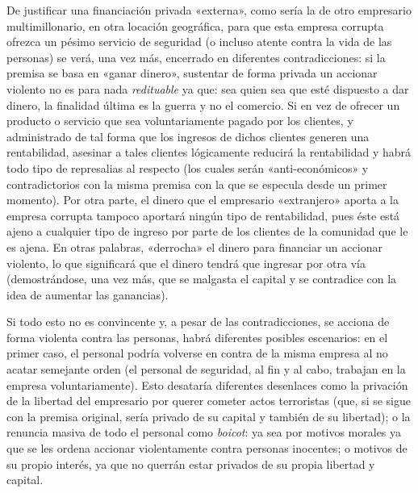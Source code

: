 \documentclass[12pt,a4paper,twoside]{book}
\begin{document}
De justificar una financiación privada «externa», como sería la de otro empresario multimillonario, en otra locación geográfica, para que esta empresa corrupta ofrezca un pésimo servicio de seguridad (o incluso atente contra la vida de las personas) se verá, una vez más, encerrado en diferentes contradicciones: si la premisa se basa en «ganar dinero», sustentar de forma privada un accionar violento no es para nada \textit{redituable} ya que: sea quien sea que esté dispuesto a dar dinero, la finalidad última es la guerra y no el comercio. Si en vez de ofrecer un producto o servicio que sea voluntariamente pagado por los clientes, y administrado de tal forma que los ingresos de dichos clientes generen una rentabilidad, asesinar a tales clientes lógicamente reducirá la rentabilidad y habrá todo tipo de represalias al respecto (los cuales serán «anti-económicos» y contradictorios con la misma premisa con la que se especula desde un primer momento). Por otra parte, el dinero que el empresario «extranjero» aporta a la empresa corrupta tampoco aportará ningún tipo de rentabilidad, pues éste está ajeno a cualquier tipo de ingreso por parte de los clientes de la comunidad que le es ajena. En otras palabras, «derrocha» el dinero para financiar un accionar violento, lo que significará que el dinero tendrá que ingresar por otra vía (demostrándose, una vez más, que se malgasta el capital y se contradice con la idea de aumentar las ganancias).

Si todo esto no es convincente y, a pesar de las contradicciones, se acciona de forma violenta contra las personas, habrá diferentes posibles escenarios: en el primer caso, el personal podría volverse en contra de la misma empresa al no acatar semejante orden (el personal de seguridad, al fin y al cabo, trabajan en la empresa voluntariamente). Esto desataría diferentes desenlaces como la privación de la libertad del empresario por querer cometer actos terroristas (que, si se sigue con la premisa original, sería privado de su capital y también de su libertad); o la renuncia masiva de todo el personal como \textit{boicot}: ya sea por motivos morales ya que se les ordena accionar violentamente contra personas inocentes; o motivos de su propio interés, ya que no querrán estar privados de su propia libertad y capital.
\end{document}
